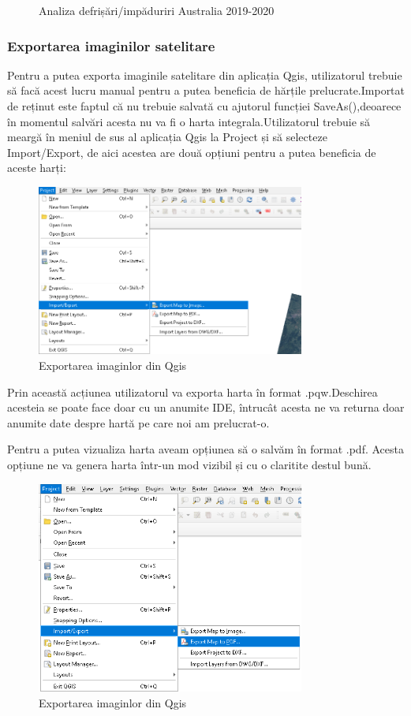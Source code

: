 \documentclass[12pt,a4paper]{article}
\theoremstyle{definition}
\theoremstyle{remark}
\begin{document}
\begin{figure}[!htb]
\begin{minipage}{0.48\textwidth}
     \caption{Analiza defrișări/impăduriri Australia 2019-2020}
   \end{minipage}
\end{figure} 

\newpage
\subsubsection{Exportarea imaginilor satelitare}

Pentru a putea exporta imaginile satelitare  din aplicația Qgis, utilizatorul trebuie să facă acest lucru manual pentru a putea beneficia de hărțile prelucrate.Importat de reținut este faptul că nu trebuie salvată cu  ajutorul funcției SaveAs(),deoarece în momentul salvări acesta nu va fi o harta integrala.Utilizatorul trebuie  să meargă în meniul de sus al aplicația Qgis la Project și să selecteze Import/Export, de aici acestea are două opțiuni pentru a putea beneficia de aceste harți: 

\begin{figure}[H]
  \centering
  \includegraphics[width=250pt]{export image.PNG}
  \caption{Exportarea imaginlor din Qgis }   
\end{figure}

Prin această acțiunea utilizatorul va exporta harta în format .pqw.Deschirea acesteia se poate face doar cu un anumite IDE, întrucât acesta ne va returna doar anumite date despre hartă pe care noi am prelucrat-o.

Pentru a putea vizualiza harta aveam opțiunea să o salvăm în format .pdf. Acesta opțiune ne va genera harta într-un mod vizibil și cu o claritite destul bună.

\begin{figure}[H]
  \centering
  \includegraphics[width=250pt]{exportpdf.PNG}
  \caption{Exportarea imaginlor din Qgis }   
\end{figure}
\end{document}
